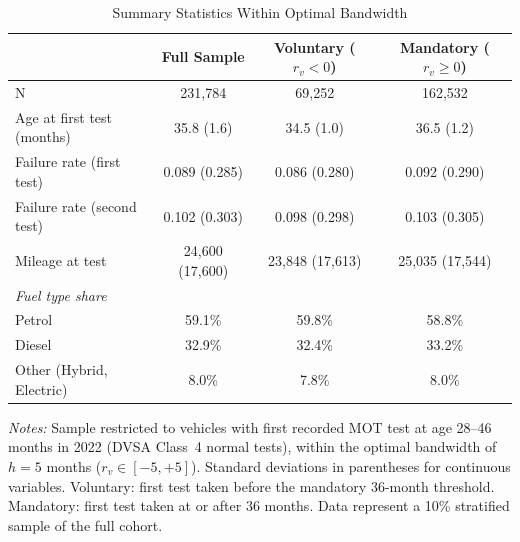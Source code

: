 \begin{table}[htbp]
\centering
\caption{Summary Statistics Within Optimal Bandwidth}\label{tab:tab:summary}
\begin{threeparttable}
\begin{tabular}{lccc}
\toprule
 & Full Sample & Voluntary ($r_v < 0$) & Mandatory ($r_v \geq 0$) \\
\midrule
N & 231,784 & 69,252 & 162,532 \\
Age at first test (months) & 35.8 (1.6) & 34.5 (1.0) & 36.5 (1.2) \\
Failure rate (first test) & 0.089 (0.285) & 0.086 (0.280) & 0.092 (0.290) \\
Failure rate (second test) & 0.102 (0.303) & 0.098 (0.298) & 0.103 (0.305) \\
Mileage at test & 24,600 (17,600) & 23,848 (17,613) & 25,035 (17,544) \\
\midrule
\multicolumn{4}{l}{\textit{Fuel type share}} \\
Petrol & 59.1\% & 59.8\% & 58.8\% \\
Diesel & 32.9\% & 32.4\% & 33.2\% \\
Other (Hybrid, Electric) & 8.0\% & 7.8\% & 8.0\% \\
\bottomrule
\end{tabular}
\begin{tablenotes}
\item \textit{Notes:} Sample restricted to vehicles with first recorded MOT test at age 28--46 months in 2022 (DVSA Class~4 normal tests), within the optimal bandwidth of $h = 5$ months ($r_v \in [-5, +5]$). Standard deviations in parentheses for continuous variables. Voluntary: first test taken before the mandatory 36-month threshold. Mandatory: first test taken at or after 36 months. Data represent a 10\% stratified sample of the full cohort.
\end{tablenotes}
\end{threeparttable}
\end{table}
